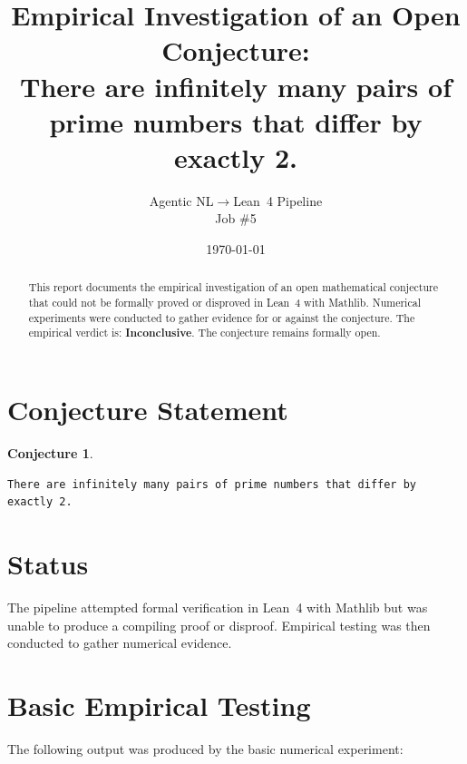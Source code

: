 \documentclass[11pt]{article}
\title{Empirical Investigation of an Open Conjecture:\\
There are infinitely many pairs of prime numbers that differ by exactly 2.}
\author{Agentic NL$\to$Lean~4 Pipeline \\ \small Job \#5}
\date{\today}
\newtheorem{conjecture}{Conjecture}
\begin{document}
\maketitle

\begin{abstract}
This report documents the empirical investigation of an open mathematical conjecture
that could not be formally proved or disproved in Lean~4 with Mathlib.
Numerical experiments were conducted to gather evidence for or against the conjecture.
The empirical verdict is: \textbf{\textcolor{orange!80!black}{Inconclusive}}.
The conjecture remains formally open.
\end{abstract}

\section{Conjecture Statement}

\begin{conjecture}
\begin{lstlisting}
There are infinitely many pairs of prime numbers that differ by exactly 2.
\end{lstlisting}
\end{conjecture}

\section{Status}

\begin{center}
\end{center}

The pipeline attempted formal verification in Lean~4 with Mathlib but was unable to
produce a compiling proof or disproof. Empirical testing was then conducted to gather
numerical evidence.

\section{Basic Empirical Testing}

The following output was produced by the basic numerical experiment:
\end{document}
